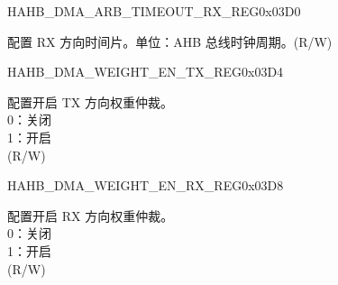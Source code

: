 {    \begin{register}{H}{AHB\_DMA\_ARB\_TIMEOUT\_RX\_REG}{0x03D0}\label{regdesc:AHBDMAARBTIMEOUTRXREG}
    \regnewline%
    \begin{regdesc}\begin{reglist}
    \label{fielddesc:AHBDMAARBTIMEOUTRX}\item [AHB\_DMA\_ARB\_TIMEOUT\_RX] 配置 RX 方向时间片。单位：AHB 总线时钟周期。(R/W)
    \end{reglist}\end{regdesc}
    \end{register}


    \begin{register}{H}{AHB\_DMA\_WEIGHT\_EN\_TX\_REG}{0x03D4}\label{regdesc:AHBDMAWEIGHTENTXREG}
    \regnewline%
    \begin{regdesc}\begin{reglist}
    \label{fielddesc:AHBDMAWEIGHTENTX}\item [AHB\_DMA\_WEIGHT\_EN\_TX] 配置开启 TX 方向权重仲裁。\\
    0：关闭\\
    1：开启\\ (R/W)
    \end{reglist}\end{regdesc}
    \end{register}


    \begin{register}{H}{AHB\_DMA\_WEIGHT\_EN\_RX\_REG}{0x03D8}\label{regdesc:AHBDMAWEIGHTENRXREG}
    \regnewline%
    \begin{regdesc}\begin{reglist}
    \label{fielddesc:AHBDMAWEIGHTENRX}\item [AHB\_DMA\_WEIGHT\_EN\_RX] 配置开启 RX 方向权重仲裁。\\
    0：关闭\\
    1：开启\\ (R/W)
    \end{reglist}\end{regdesc}
    \end{register}
}


